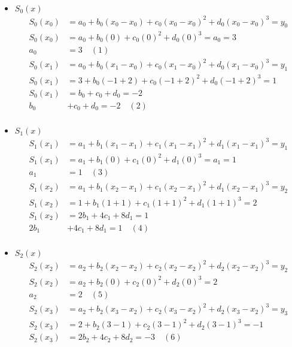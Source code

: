 \documentclass[12pt]{article}
\begin{document}
\begin{enumerate}
\begin{enumerate}
        \begin{itemize}
            \item $S_0(x)$
            \[ 
            \begin{aligned}
                S_0(x_0) &= a_0 + b_0 (x_0-x_0) + c_0 (x_0-x_0)^2 + d_0 (x_0-x_0)^3 = y_0 \\
                S_0(x_0) &= a_0 + b_0 (0) + c_0 (0)^2 + d_0 (0)^3 = a_0 = 3 \\
                a_0 &= 3 \quad (1)\\
                S_0(x_1) &= a_0 + b_0 (x_1-x_0) + c_0 (x_1-x_0)^2 + d_0 (x_1-x_0)^3 = y_1\\
                S_0(x_1) &= 3 + b_0 (-1+2) + c_0 (-1+2)^2 + d_0 (-1+2)^3 = 1\\
                S_0(x_1) &= b_0 + c_0 + d_0 = -2\\
                b_0& + c_0 + d_0 = -2 \quad (2)\\
            \end{aligned}
            \]
            \item $S_1(x)$
            \[ 
            \begin{aligned}
                S_1(x_1) &= a_1 + b_1 (x_1-x_1) + c_1 (x_1-x_1)^2 + d_1 (x_1-x_1)^3 = y_1 \\
                S_1(x_1) &= a_1 + b_1 (0) + c_1 (0)^2 + d_1 (0)^3 = a_1 = 1 \\
                a_1 &= 1 \quad (3)\\
                S_1(x_2) &= a_1 + b_1 (x_2-x_1) + c_1 (x_2-x_1)^2 + d_1 (x_2-x_1)^3 = y_2\\
                S_1(x_2) &= 1 + b_1 (1+1) + c_1 (1+1)^2 + d_1 (1+1)^3 = 2\\
                S_1(x_2) &=  2b_1+ 4c_1 + 8d_1= 1\\
                2b_1&+ 4c_1 + 8d_1= 1 \quad (4)\\
            \end{aligned}
            \]
            \item $S_2(x)$
            \[ 
            \begin{aligned}
                S_2(x_2) &= a_2 + b_2 (x_2-x_2) + c_2 (x_2-x_2)^2 + d_2 (x_2-x_2)^3 = y_2\\
                S_2(x_2) &= a_2 + b_2 (0) + c_2 (0)^2 + d_2 (0)^3 = 2\\
                a_2& = 2 \quad (5)\\
                S_2(x_3) &= a_2 + b_2 (x_3-x_2) + c_2 (x_3-x_2)^2 + d_2 (x_3-x_2)^3 = y_3\\  
                S_2(x_3) &= 2 + b_2 (3-1) + c_2 (3-1)^2 + d_2 (3-1)^3 = -1\\  
                S_2(x_3) &=   2b_2 + 4c_2  + 8d_2  = -3 \quad (6)\\  
            \end{aligned}
            \]
        \end{itemize}


\end{enumerate}
\end{enumerate}
\end{document}
